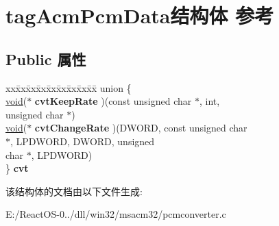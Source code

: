 \hypertarget{structtag_acm_pcm_data}{}\section{tag\+Acm\+Pcm\+Data结构体 参考}
\label{structtag_acm_pcm_data}
\subsection*{Public 属性}
\begin{DoxyCompactItemize}
\item 
\mbox{\label{structtag_acm_pcm_data_a6223014c4a3fe04d31b0c80797aff3e7}} 
\begin{tabbing}
xx\=xx\=xx\=xx\=xx\=xx\=xx\=xx\=xx\=\kill
union \{\\
\>\hyperlink{interfacevoid}{void}($\ast$ {\bfseries cvtKeepRate} )(const unsigned char $\ast$, int, \\
\>\>unsigned char $\ast$)\\
\>\hyperlink{interfacevoid}{void}($\ast$ {\bfseries cvtChangeRate} )(DWORD, const unsigned char \\
\>\>$\ast$, LPDWORD, DWORD, unsigned \\
\>\>char $\ast$, LPDWORD)\\
\} {\bfseries cvt}\\

\end{tabbing}\end{DoxyCompactItemize}


该结构体的文档由以下文件生成\+:\begin{DoxyCompactItemize}
\item 
E\+:/\+React\+O\+S-\/0../dll/win32/msacm32/pcmconverter.\+c\end{DoxyCompactItemize}
